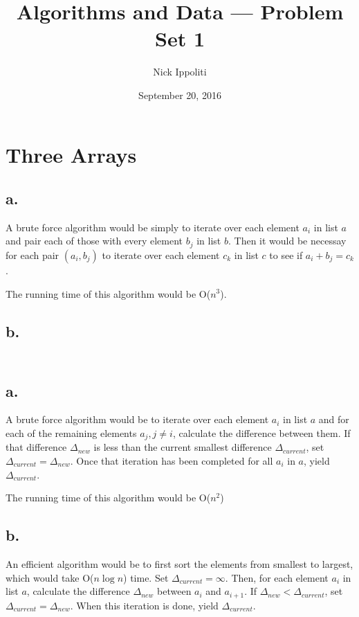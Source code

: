 \documentclass[14pt, letterpaper]{article}
\title{Algorithms and Data --- Problem Set 1}
\author{Nick Ippoliti}
\date{September 20, 2016}
\begin{document}
\begin{titlepage}
	\maketitle
\end{titlepage}

\section{Three Arrays}
\subsection{a.}
A brute force algorithm would be simply to iterate over each element $a_i$ in 
list $a$ and pair each of those with every element $b_j$ in list $b$. Then it
would be necessay for each pair $(a_i, b_j)$ to iterate over each element $c_k$
in list $c$ to see if $a_i + b_j = c_k$.

The running time of this algorithm would be O($n^3$).

\subsection{b.}
\begin{lstlisting}

\end{lstlisting}

\section{}
\subsection{a.}
A brute force algorithm would be to iterate over each element $a_i$ in list $a$
and for each of the remaining elements $a_j, j \neq i$, calculate the difference
between them. If that difference $\Delta_{new}$ is less than the current 
smallest difference $\Delta_{current}$, set $\Delta_{current} =  \Delta_{new}$.
Once that iteration has been completed for all $a_i$ in $a$, yield 
$\Delta_{current}$.

The running time of this algorithm would be O($n^2$)

\subsection{b.}
An efficient algorithm would be to first sort the elements from smallest to
largest, which would take O($n \log n$) time. Set $\Delta_{current} = \infty$.
Then, for each element $a_i$ in list $a$, calculate the difference
$\Delta_{new}$ between $a_i$ and $a_{i + 1}$. If
$\Delta_{new} < \Delta_{current}$, set $\Delta_{current} = \Delta_{new}$.
When this iteration is done, yield $\Delta_{current}$.
\end{document}
